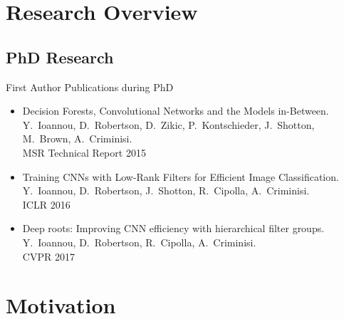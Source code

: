 \documentclass[t,xcolor=dvipsnames]{beamer}
\begin{document}
\usebackgroundtemplate{}

\section{Research Overview}

\subsection{PhD Research}

\begin{frame}{First Author Publications during PhD}
\begin{itemize}
    \item Decision Forests, Convolutional Networks and the Models in-Between.\\{\footnotesize Y.\ Ioannou, D.\ Robertson, D.\ Zikic, P.\ Kontschieder, J.\ Shotton, M.\ Brown, A.\ Criminisi.\\MSR Technical Report 2015} 
    \item Training CNNs with Low-Rank Filters for Efficient Image Classification.\\{\footnotesize Y.\ Ioannou, D.\ Robertson, J.\ Shotton, R.\ Cipolla, A.\ Criminisi. \\ICLR 2016}
    \item Deep roots: Improving CNN efficiency with hierarchical filter groups.\\{\footnotesize Y.\ Ioannou, D.\ Robertson, R.\ Cipolla, A.\ Criminisi.\\CVPR 2017}
    
\end{itemize}
\end{frame}

\section{Motivation}

\end{document}
